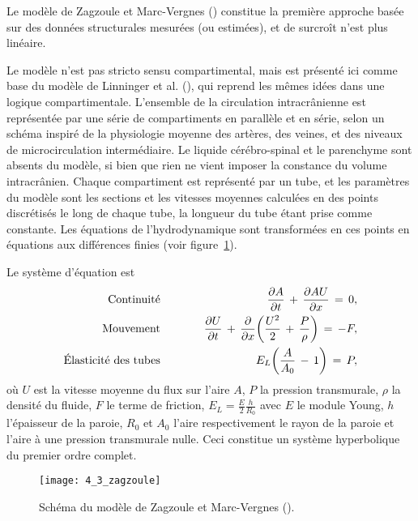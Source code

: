 Le modèle de Zagzoule et Marc-Vergnes (\cite{Zagzoule1986}) constitue la première approche basée sur des
données structurales mesurées (ou estimées), et de surcroît n'est plus linéaire. 

Le modèle n'est pas
stricto sensu compartimental, mais est présenté ici comme base du modèle de Linninger et al. (\cite{Linninger2009}), qui
reprend les mêmes idées dans une logique compartimentale. L'ensemble de la circulation
intracrânienne est représentée par une série de compartiments en parallèle et en série, selon un
schéma inspiré de la physiologie moyenne des artères, des veines, et des niveaux de microcirculation
intermédiaire. Le liquide cérébro-spinal et le parenchyme sont absents du modèle, si bien que rien ne
vient imposer la constance du volume intracrânien. Chaque compartiment est représenté par un tube,
et les paramètres du modèle sont les sections et les vitesses moyennes calculées en des points
discrétisés le long de chaque tube, la longueur du tube étant prise comme constante. Les équations de l'hydrodynamique sont transformées en ces points en équations aux différences finies (voir figure~\ref{fig:4_3_zagzoule}). 

Le système
d'équation est
\begin{eqnarray}
 \mbox{Continuité\hspace{1cm}}&&\frac{\partial A}{\partial t}\,+\,\frac{\partial A U}{\partial x}\,=\,0,\\
\mbox{Mouvement\hspace{1cm}}&&\frac{\partial U}{\partial t}\,+\,\frac{\partial}{\partial x} \biggl(\frac{U^2}{2}\,+\,\frac{P}{\rho}\biggr)\,=\,-F,\\
\mbox{\'Elasticité  des tubes\hspace{1cm}}&&E_L\biggl(\frac{A}{A_0}\,-\,1\biggr)\,=\,P,
\end{eqnarray}
où $U$ est la vitesse moyenne du flux sur l'aire $A$, $P$ la pression transmurale, $\rho$ la densité du fluide, $F$ le terme de friction, $E_L=\frac{E}{2}\frac{h}{R_0}$ avec $E$ le module Young, $h$ l'épaisseur de la paroie, $R_0$ et $A_0$ l'aire respectivement le rayon de la paroie et l'aire à une pression transmurale nulle.
 Ceci constitue un système hyperbolique du premier ordre complet. 
\begin{figure}[!t]
\centering
\texttt{[image: 4\_3\_zagzoule]}
\caption{Schéma du modèle de Zagzoule et Marc-Vergnes (\cite{Zagzoule1986}).}
\label{fig:4_3_zagzoule}	
\end{figure}


